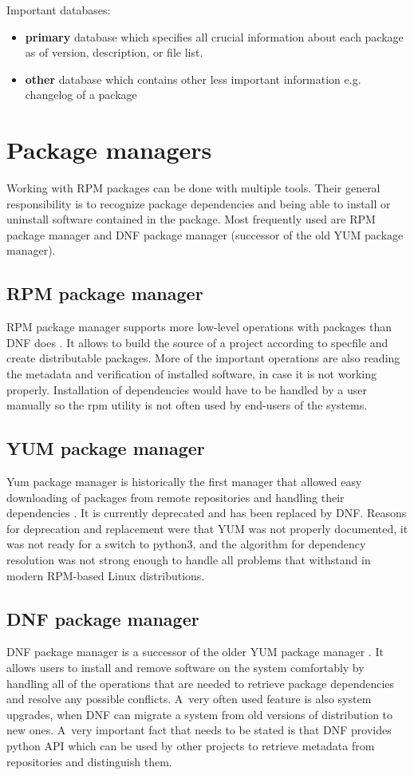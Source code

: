 Important databases:
\begin{itemize}
  \item \textbf{primary} database which specifies all crucial information about each package as of version, description, or file list.
  \item \textbf{other} database which contains other less important information e.g. changelog of a package
\end{itemize}

\section{Package managers}
Working with RPM packages can be done with multiple tools. Their general responsibility is to recognize
package dependencies and being able to install or uninstall software contained in the package.
Most frequently used are RPM package manager and DNF package manager (successor of the old
YUM package manager).

\subsection*{RPM package manager}
RPM package manager supports more low-level operations with packages than DNF does \cite{RPMPackageManager}. It allows
to build the source of a project according to specfile and create distributable packages. More of the
important operations are also reading the metadata and verification of installed software, in
case it is not working properly. Installation of dependencies would have to be handled by a user
manually so the rpm utility is not often used by end-users of the systems.

\subsection*{YUM package manager}
Yum package manager is historically the first manager that allowed easy downloading of packages
from remote repositories and handling their dependencies \cite{YUMPackageManager}. It is currently deprecated and has been
replaced by DNF. Reasons for deprecation and replacement were that YUM was not properly documented,
it was not ready for a switch to python3, and the algorithm for dependency resolution was not strong enough
to handle all problems that withstand in modern RPM-based Linux distributions.

\subsection*{DNF package manager}
DNF package manager is a successor of the older YUM package manager \cite{DNFPackageManager}. It allows users to install and remove software
on the system comfortably by handling all of the operations that are needed to retrieve package dependencies
and resolve any possible conflicts. A~very often used feature is also system upgrades, when
DNF can migrate a system from old versions of distribution to new ones. A~very important fact
that needs to be stated is that DNF provides python API which can be used by other projects to retrieve metadata
from repositories and distinguish them.

